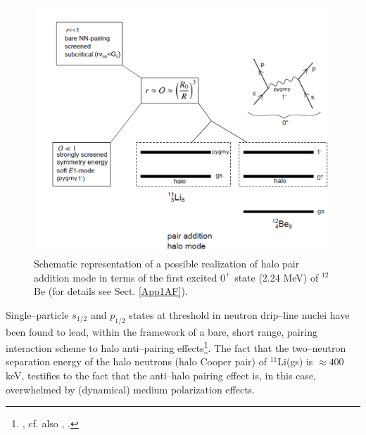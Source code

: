    \begin{figure}
   \centerline{\includegraphics*[width=12cm,angle=0]{C8/figsC8/pigmy}}
   	\caption{Schematic representation of a possible realization of halo pair addition mode in terms of the first excited $0^+$ state (2.24 MeV) of $^{12}$Be (for details see Sect. \ref{App1AF}).}\label{fig8_2_4x}
   \end{figure}
   
   
   
 Single--particle $s_{1/2}$ and $p_{1/2}$ states at threshold in neutron drip--line nuclei have been found to lead, within the framework of a bare, short range, pairing interaction scheme to halo anti--pairing effects\footnote{\citet{Bennaceur:00}, cf. also \citet{Hamamoto:03}, \citet{Hamamoto:04}.}. The fact that the two--neutron separation energy of the halo neutrons (halo Cooper pair) of $^{11}$Li(gs) is $\approx 400$keV, testifies to the fact that the anti--halo pairing effect is, in this case, overwhelmed by (dynamical) medium polarization effects.
 

 
 
